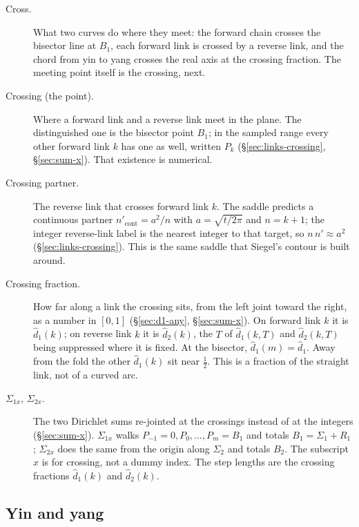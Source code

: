 \documentclass[11pt]{article}
\theoremstyle{definition}
\begin{document}
\begin{description}
\item[Cross.]
What two curves do where they meet: the forward chain crosses the
bisector line at $B_1$, each forward link is crossed by a reverse
link, and the chord from yin to yang crosses the real axis at the
crossing fraction. The meeting point itself is the crossing,
next.

\item[Crossing (the point).]
Where a forward link and a reverse link meet in the plane.
The distinguished one is the bisector point $B_1$; in the sampled
range every other forward link $k$ has one as well, written $P_k$
(\S\ref{sec:links-crossing}, \S\ref{sec:sum-x}). That existence is
numerical.

\item[Crossing partner.]
The reverse link that crosses forward link $k$.
The saddle predicts a continuous partner
$n'_{\mathrm{cont}}=a^{2}/n$ with $a=\sqrt{t/2\pi}$ and $n=k+1$;
the integer reverse-link label is the nearest integer to that
target, so $n\,n'\approx a^{2}$
(\S\ref{sec:links-crossing}).
This is the same saddle that Siegel's contour is built around.

\item[Crossing fraction.]
How far along a link the crossing sits, from the left joint toward
the right, as a number in $[0,1]$
(\S\ref{sec:d1-any}, \S\ref{sec:sum-x}).
On forward link $k$ it is $\hat d_1(k)$; on reverse
link $k$ it is $\hat d_2(k)$, the $T$ of $\hat d_1(k,T)$ and
$\hat d_2(k,T)$ being suppressed where it is fixed.
At the bisector, $\hat d_1(m)=\hat d_1$.
Away from the fold the other $\hat d_1(k)$ sit near $\tfrac12$.
This is a fraction of the straight link, not of a curved arc.

\item[$\Sigma_{1x}$, $\Sigma_{2x}$.]
The two Dirichlet sums re-jointed at the crossings instead of at
the integers
(\S\ref{sec:sum-x}).
$\Sigma_{1x}$ walks $P_{-1}=0,P_0,\dots,P_m=B_1$ and totals
$B_1=\Sigma_1+R_{1}$;
$\Sigma_{2x}$ does the same from the origin along $\Sigma_2$ and
totals $B_2$.
The subscript $x$ is for crossing, not a dummy index.
The step lengths are the crossing fractions $\hat d_1(k)$ and
$\hat d_2(k)$.
\end{description}

\subsection*{Yin and yang}
\end{document}
